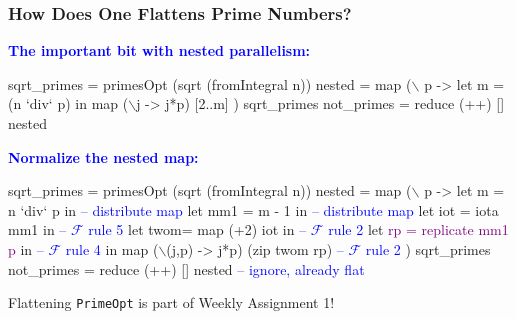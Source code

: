 \documentclass{beamer}
\newcommand{\blue}[1]{\textcolor{Blue}{{#1}}}
\newcommand{\purple}[1]{\textcolor{Purple}{{#1}}}
\renewcommand{\emph}[1]{\textcolor{structure}{#1}}
\newcommand{\emp}[1]{\textcolor{DikuRed}{ #1}}
\newcommand{\mymath}[1]{$ #1 $}
\newcommand{\myindu}[1]{^{#1}}
\begin{document}
\begin{frame}[fragile,t]
  \frametitle{How Does One Flattens Prime Numbers?}

\blue{\bf The important bit with nested parallelism:}
\begin{colorcode}[fontsize=\scriptsize]
sqrt_primes = primesOpt (sqrt (fromIntegral n))
nested = \emp{map} (\mymath{\backslash}\emp{p} -> let m = (n `div` p)
                  in  \emp{map} (\mymath{\backslash}j -> j*p) [2..m]
             ) \emp{sqrt_primes}
not_primes  = \emph{reduce} (++) [] nested
\end{colorcode}

\bigskip
\pause

\blue{\bf Normalize the nested map:}
\begin{colorcode}[fontsize=\scriptsize]
sqrt_primes = primesOpt (sqrt (fromIntegral n))
nested = \emp{map} (\mymath{\backslash}\emp{p} -> 
                  let \emph{m   = n `div` p}       in          \blue{-- distribute map}
                  let \emph{mm1 = m - 1}           in          \blue{-- distribute map}
                  let \emp{iot = \emp{iota} mm1}        in          \blue{-- \mymath{\mathcal{F}} rule 5}
                  let \emph{twom= \emp{map} (+2) iot}    in          \blue{-- \mymath{\mathcal{F}} rule 2}
                  let \purple{rp  = replicate mm1 p} in          \blue{-- \mymath{\mathcal{F}} rule 4}
                  in  \emph{map} (\mymath{\backslash}(j,p) -> j*p) (zip twom rp) \blue{-- \mymath{\mathcal{F}} rule 2}
             ) \emp{sqrt_primes}
not_primes  = \emph{reduce} (++) [] nested               \blue{-- ignore, already flat}
\end{colorcode}

\alert{Flattening {\tt PrimeOpt} is part of Weekly Assignment 1!}

\end{frame}


%
%
%
%
%
%
%
%
\end{document}
